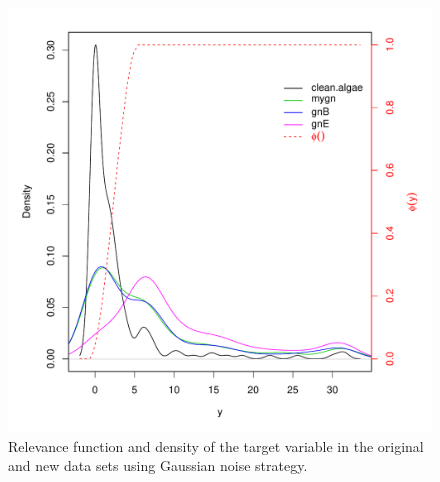 \documentclass[10pt,a4paper]{article}\usepackage[]{graphicx}\usepackage[]{color}
\makeatletter
\def\maxwidth{ %
  \ifdim\Gin@nat@width>\linewidth
    \linewidth
  \else
    \Gin@nat@width
  \fi
}
\newenvironment{knitrout}{}{} %
\makeatother
\begin{document}
\begin{knitrout}\footnotesize
{}\color{fgcolor}\begin{figure}

{\centering \includegraphics[width=\maxwidth]{figures/UBL-GN_plot1-1} 

}

\caption[Relevance function and density of the target variable in the original and new data sets using Gaussian noise strategy]{Relevance function and density of the target variable in the original and new data sets using Gaussian noise strategy.}\label{fig:GN_plot1}
\end{figure}


\end{knitrout}
\end{document}
